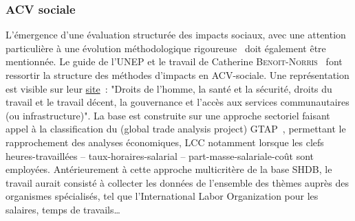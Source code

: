     
\subsubsection{ACV sociale}
\label{sec:ACV social}
L'émergence d'une évaluation structurée des impacts sociaux, avec une attention particulière à une évolution méthodologique rigoureuse~\cite{grubert_rigor_2016} doit également être mentionnée.
Le guide de l'UNEP\cite{united_nations_environment_programme_guidelines_2009} et le travail de Catherine \textsc{Benoit-Norris}~\cite{benoit-norris_identifying_2012,benoit_norris_data_2014,benoit-norris_tutorial_2013} font ressortir la structure des méthodes d'impacts en ACV-sociale.
Une représentation est visible sur leur \href{http://socialhotspot.org/user-portal-2/portal-info/}{site}~:
"Droits de l'homme, la santé et la sécurité, droits du travail et le travail décent, la gouvernance et l'accès aux services communautaires (ou infrastructure)".
  La base est construite sur une approche sectoriel faisant appel à la classification du (global trade analysis project) GTAP~\cite{_gtap_????}, permettant le rapprochement des analyses économiques, \gls{LCC} notamment lorsque les clefs heures-travaillées -- taux-horaires-salarial -- part-masse-salariale-coût sont employées.
  Antérieurement à cette approche multicritère de la base \gls{SHDB}, le travail aurait consisté à collecter les données de l'ensemble des thèmes auprès des organismes spécialisés, tel que l'International Labor Organization pour les salaires, temps de travails\ldots
  
